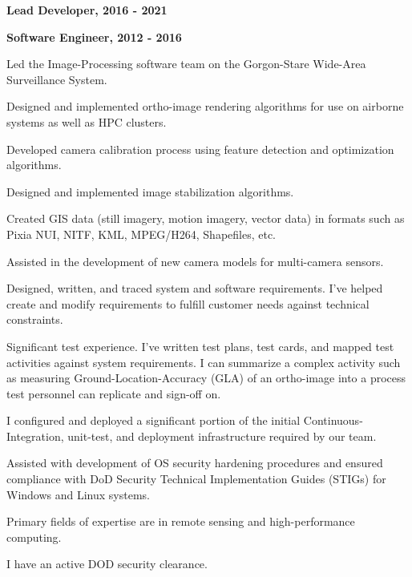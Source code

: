 \documentclass[10pt]{article}
\newenvironment{outerlist}[1][\enskip\textbullet]%
        {\begin{itemize}[#1]}{\end{itemize}%
         \vspace{-.6\baselineskip}}
\newenvironment{innerlist}[1][\enskip\textbullet]%
        {\begin{compactitem}[#1]}{\end{compactitem}}
\begin{document}
\begin{outerlist}
         \item \textbf{Lead Developer, 2016 - 2021}
         \item \textbf{Software Engineer, 2012 - 2016} 
         \begin{innerlist}
            \item Led the Image-Processing software team on the Gorgon-Stare Wide-Area Surveillance System.
            \item Designed and implemented ortho-image rendering algorithms for use on airborne systems as well as HPC clusters.
            \item Developed camera calibration process using feature detection and optimization algorithms.
            \item Designed and implemented image stabilization algorithms.
            \item Created GIS data (still imagery, motion imagery, vector data) in formats
                  such as Pixia NUI, NITF, KML, MPEG/H264, Shapefiles, etc.
            \item Assisted in the development of new camera models for multi-camera sensors.
            \item Designed, written, and traced system and software requirements.  I've helped create and modify requirements to fulfill customer needs against technical constraints.
            \item Significant test experience.  I've written test plans, test cards, and mapped test activities against system requirements. I can summarize a complex activity such as measuring Ground-Location-Accuracy (GLA) of an ortho-image into a process test personnel can replicate and sign-off on.
         \item I configured and deployed a significant portion of the initial Continuous-Integration, unit-test, and deployment infrastructure 
               required by our team.
         \item Assisted with development of OS security hardening procedures and ensured compliance with DoD Security 
               Technical Implementation Guides (STIGs) for Windows and Linux systems.
         \end{innerlist}
         \item Primary fields of expertise are in remote sensing and high-performance computing. 
         \item I have an active DOD security clearance.
     \end{outerlist}
\clearpage
\end{document}
